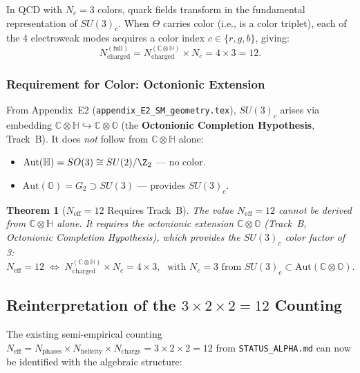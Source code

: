 \documentclass[11pt,a4paper]{article}
\newcommand{\C}{\mathbb{C}}
\renewcommand{\H}{\mathbb{H}}
\renewcommand{\O}{\mathbb{O}}
\newcommand{\Aut}{\mathrm{Aut}}
\newtheorem{theorem}{Theorem}
\theoremstyle{remark}
\begin{document}
In QCD with $N_c = 3$ colors, quark fields transform in the fundamental representation of
$SU(3)_c$. When $\Theta$ carries color (i.e., is a color triplet), each of the 4
electroweak modes acquires a color index $c \in \{r, g, b\}$, giving:
\begin{equation}
  N_{\mathrm{charged}}^{(\mathrm{full})}
  = N_{\mathrm{charged}}^{(\C\otimes\H)} \times N_c
  = 4 \times 3 = 12.
  \label{eq:Ncharged_full}
\end{equation}

\subsubsection{Requirement for Color: Octonionic Extension}

From Appendix~E2 (\texttt{appendix\_E2\_SM\_geometry.tex}), $SU(3)_c$ arises via embedding
$\C\otimes\H \hookrightarrow \C\otimes\O$ (the \textbf{Octonionic Completion Hypothesis},
Track~B). It does \emph{not} follow from $\C\otimes\H$ alone:
\begin{itemize}
  \item $\Aut(\H) = SO(3) \cong SU(2)/\Z_2$ — no color.
  \item $\Aut(\O) = G_2 \supset SU(3)$ — provides $SU(3)_c$.
\end{itemize}

\begin{theorem}[$N_{\mathrm{eff}} = 12$ Requires Track~B]
\label{thm:Neff12_requires_TrackB}
The value $N_{\mathrm{eff}} = 12$ cannot be derived from $\C\otimes\H$ alone.
It requires the octonionic extension $\C\otimes\O$ (Track~B, Octonionic Completion
Hypothesis), which provides the $SU(3)_c$ color factor of 3:
\begin{equation}
  \boxed{N_{\mathrm{eff}} = 12
    \;\Longleftrightarrow\;
    N_{\mathrm{charged}}^{(\C\otimes\H)} \times N_c = 4 \times 3,
    \;\text{ with } N_c = 3 \text{ from } SU(3)_c \subset \Aut(\C\otimes\O).}
\end{equation}
\end{theorem}

\subsection{Reinterpretation of the $3 \times 2 \times 2 = 12$ Counting}

The existing semi-empirical counting $N_{\mathrm{eff}} = N_{\mathrm{phases}} \times
N_{\mathrm{helicity}} \times N_{\mathrm{charge}} = 3 \times 2 \times 2 = 12$ from
\texttt{STATUS\_ALPHA.md} can now be identified with the algebraic structure:
\end{document}
